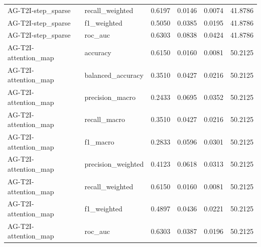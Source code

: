 \begin{tabular}{llrrrr}
AG-T2I-step_sparse & recall_weighted & 0.6197 & 0.0146 & 0.0074 & 41.8786 \\
AG-T2I-step_sparse & f1_weighted & 0.5050 & 0.0385 & 0.0195 & 41.8786 \\
AG-T2I-step_sparse & roc_auc & 0.6303 & 0.0838 & 0.0424 & 41.8786 \\
AG-T2I-attention_map & accuracy & 0.6150 & 0.0160 & 0.0081 & 50.2125 \\
AG-T2I-attention_map & balanced_accuracy & 0.3510 & 0.0427 & 0.0216 & 50.2125 \\
AG-T2I-attention_map & precision_macro & 0.2433 & 0.0695 & 0.0352 & 50.2125 \\
AG-T2I-attention_map & recall_macro & 0.3510 & 0.0427 & 0.0216 & 50.2125 \\
AG-T2I-attention_map & f1_macro & 0.2833 & 0.0596 & 0.0301 & 50.2125 \\
AG-T2I-attention_map & precision_weighted & 0.4123 & 0.0618 & 0.0313 & 50.2125 \\
AG-T2I-attention_map & recall_weighted & 0.6150 & 0.0160 & 0.0081 & 50.2125 \\
AG-T2I-attention_map & f1_weighted & 0.4897 & 0.0436 & 0.0221 & 50.2125 \\
AG-T2I-attention_map & roc_auc & 0.6303 & 0.0387 & 0.0196 & 50.2125 \\
\bottomrule
\end{tabular}
